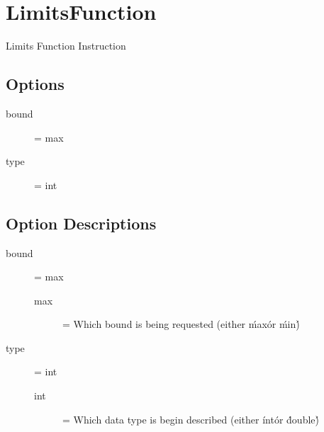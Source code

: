 \section{LimitsFunction}

Limits Function Instruction

\subsection{Options}
\begin{description}
\item[bound] = max
\item[type] = int
\end{description}

\subsection{Option Descriptions}
\begin{description}
\item[bound] = max
	\begin{description}
	\item[max] = Which bound is being requested (either \'max\' or \'min\')
	\end{description}
\item[type] = int
	\begin{description}
	\item[int] = Which data type is begin described (either \'int\' or \'double\')
	\end{description}
\end{description}

